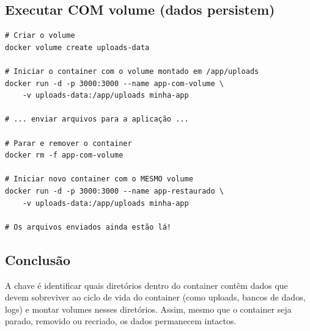 \subsection{Executar COM volume (dados persistem)}

\begin{verbatim}
# Criar o volume
docker volume create uploads-data

# Iniciar o container com o volume montado em /app/uploads
docker run -d -p 3000:3000 --name app-com-volume \
    -v uploads-data:/app/uploads minha-app

# ... enviar arquivos para a aplicação ...

# Parar e remover o container
docker rm -f app-com-volume

# Iniciar novo container com o MESMO volume
docker run -d -p 3000:3000 --name app-restaurado \
    -v uploads-data:/app/uploads minha-app

# Os arquivos enviados ainda estão lá!
\end{verbatim}

\subsection{Conclusão}

A chave é identificar quais diretórios dentro do container contêm dados que devem sobreviver ao ciclo de vida do container (como uploads, bancos de dados, logs) e montar volumes nesses diretórios. Assim, mesmo que o container seja parado, removido ou recriado, os dados permanecem intactos.
